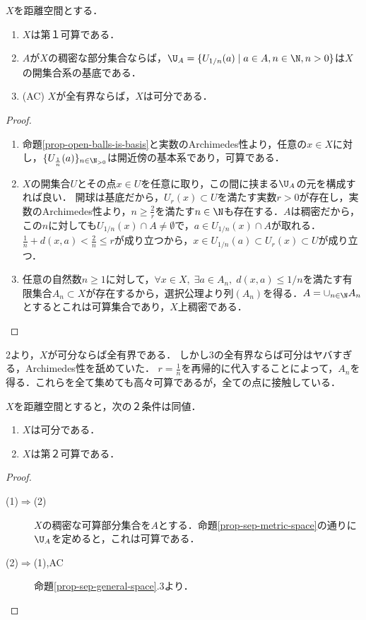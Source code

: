 \documentclass[uplatex,dvipdfmx]{jsreport}
\begin{document}
\begin{proposition}[距離空間では可分と全有界は同値]\label{prop-sep-metric-space}
    $X$を距離空間とする．
    \begin{enumerate}
        \item $X$は第１可算である．
        \item $A$が$X$の稠密な部分集合ならば，$\U_A=\{U_{1/n}(a)\mid a\in A,n\in\N,n>0\}$は$X$の開集合系の基底である．
        \item (AC) $X$が全有界ならば，$X$は可分である．
    \end{enumerate}
\end{proposition}
\begin{proof}\mbox{}
    \begin{enumerate}
        \item 命題\ref{prop-open-balls-is-basis}と実数のArchimedes性より，任意の$x\in X$に対し，$\{U_{\frac{1}{n}}(a)\}_{n\in\N_{>0}}$は開近傍の基本系であり，可算である．
        \item $X$の開集合$U$とその点$x\in U$を任意に取り，この間に挟まる$\U_A$の元を構成すれば良い．
        開球は基底だから，$U_r(x)\subset U$を満たす実数$r>0$が存在し，実数のArchimedes性より，$n\ge\frac{2}{r}$を満たす$n\in\N$も存在する．$A$は稠密だから，この$n$に対しても$U_{1/n}(x)\cap A\ne\emptyset$で，$a\in U_{1/n}(x)\cap A$が取れる．
        $\frac{1}{n}+d(x,a)<\frac{2}{n}\le r$が成り立つから，$x\in U_{1/n}(a)\subset U_r(x)\subset U$が成り立つ．
        \item 
        任意の自然数$n\ge 1$に対して，$\forall x\in X,\;\exists a\in A_n,\;d(x,a)\le 1/n$を満たす有限集合$A_n\subset X$が存在するから，選択公理より列$(A_n)$を得る．$A=\cup_{n\in\N}A_n$とするとこれは可算集合であり，$X$上稠密である．
    \end{enumerate}
\end{proof}
\begin{remarks}
    2より，$X$が可分ならば全有界である．
    しかし3の全有界ならば可分はヤバすぎる，Archimedes性を舐めていた．
    $r=\frac{1}{n}$を再帰的に代入することによって，$A_n$を得る．これらを全て集めても高々可算であるが，全ての点に接触している．
\end{remarks}

\begin{corollary}\label{cor-separability-and-second-countability}
    $X$を距離空間とすると，次の２条件は同値．
    \begin{enumerate}
        \item $X$は可分である．
        \item $X$は第２可算である．
    \end{enumerate}
\end{corollary}
\begin{proof}\mbox{}
    \begin{description}
        \item[(1)$\Rightarrow$(2)] $X$の稠密な可算部分集合を$A$とする．命題\ref{prop-sep-metric-space}の通りに$\U_A$を定めると，これは可算である．
        \item[(2)$\Rightarrow$(1),AC] 命題\ref{prop-sep-general-space}.3より．
    \end{description}
\end{proof}
\end{document}
